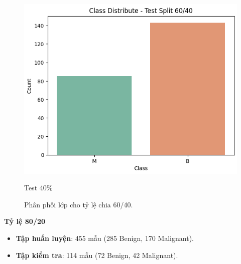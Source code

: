 \begin{figure}[h!]
\begin{minipage}[b]{0.32\linewidth}
		\centering
		\includegraphics[width=\linewidth]{figures/dataset1/2.3.png}
		\caption{Test 40\%}
		\label{fig:test40}
	\end{minipage}
	\caption{Phân phối lớp cho tỷ lệ chia 60/40.}
	\label{fig:split_60_40}
\end{figure}

\newpage
\textbf{Tỷ lệ 80/20}

\begin{itemize}
	\item \textbf{Tập huấn luyện}: 455 mẫu (285 Benign, 170 Malignant).
	\item \textbf{Tập kiểm tra}: 114 mẫu (72 Benign, 42 Malignant).
\end{itemize}

